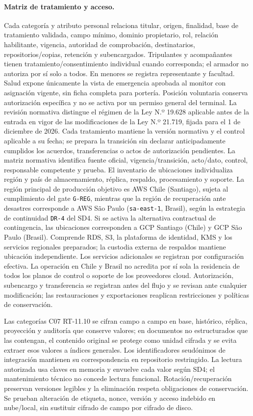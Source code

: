 \paragraph{Matriz de tratamiento y acceso.}
Cada categoría y atributo personal relaciona titular, origen, finalidad, base de tratamiento validada, campo mínimo, dominio propietario, rol, relación habilitante, vigencia, autoridad de comprobación, destinatarios, repositorios/copias, retención y subencargados. Tripulantes y acompañantes tienen tratamiento/consentimiento individual cuando corresponda; el armador no autoriza por sí solo a todos. En menores se registra representante y facultad. Salud expone únicamente la vista de emergencia aprobada al monitor con asignación vigente, sin ficha completa para portería. Posición voluntaria conserva autorización específica y no se activa por un permiso general del terminal.
La revisión normativa distingue el régimen de la Ley N.º 19.628 aplicable antes de la entrada en vigor de las modificaciones de la Ley N.º 21.719, fijada para el 1 de diciembre de 2026. Cada tratamiento mantiene la versión normativa y el control aplicable a su fecha; se prepara la transición sin declarar anticipadamente cumplidos los acuerdos, transferencias o actos de autorización pendientes. La matriz normativa identifica fuente oficial, vigencia/transición, acto/dato, control, responsable competente y prueba.
El inventario de ubicaciones individualiza región y país de almacenamiento, réplica, respaldo, procesamiento y soporte. La región principal de producción objetivo es AWS Chile (Santiago), sujeta al cumplimiento del gate \texttt{G-REG}, mientras que la región de recuperación ante desastres corresponde a AWS São Paulo (\texttt{sa-east-1}, Brasil), según la estrategia de continuidad \texttt{DR-4} del SD4. Si se activa la alternativa contractual de contingencia, las ubicaciones corresponden a GCP Santiago (Chile) y GCP São Paulo (Brasil). Comprende RDS, S3, la plataforma de identidad, KMS y los servicios regionales preparados; la custodia externa de respaldos mantiene ubicación independiente. Los servicios adicionales se registran por configuración efectiva. La operación en Chile y Brasil no acredita por sí sola la residencia de todos los planos de control o soporte de los proveedores cloud. Autorización, subencargo y transferencia se registran antes del flujo y se revisan ante cualquier modificación; las restauraciones y exportaciones reaplican restricciones y políticas de conservación.

Las categorías C07 RT-11.10 se cifran campo a campo en base, histórico, réplica, proyección y auditoría que conserve valores; en documentos no estructurados que las contengan, el contenido original se protege como unidad cifrada y se evita extraer esos valores a índices generales. Los identificadores seudónimos de integración mantienen su correspondencia en repositorio restringido. La lectura autorizada usa claves en memoria y envuelve cada valor según SD4; el mantenimiento técnico no concede lectura funcional. Rotación/recuperación preservan versiones legibles y la eliminación respeta obligaciones de conservación. Se prueban alteración de etiqueta, nonce, versión y acceso indebido en nube/local, sin sustituir cifrado de campo por cifrado de disco.

